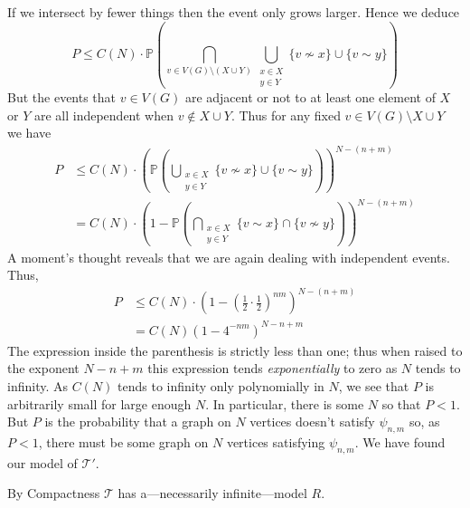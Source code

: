 \documentclass{article}
\begin{document}
\begin{enumerate}[leftmargin=*]
		If we intersect by fewer things then the event only grows larger. Hence we deduce
		\[
		P \leq C(N)\cdot\mathbb{P}\left(\bigcap_{v\in V(G)\setminus(X\cup Y)} \bigcup_{\substack{x\in X \\ y\in Y}} \{v\nsim x\}\cup \{v\sim y\}\right)
		\]
		But the events that $v\in V(G)$ are adjacent or not to at least one element of $X$ or $Y$ are all independent when $v\notin X\cup Y$. Thus for any fixed $v\in V(G)\setminus X\cup Y$ we have
		\begin{align*}
			P &\leq C(N)\cdot \left(\mathbb{P}\left(\bigcup_{\substack{x\in X \\ y\in Y}} \{v\nsim x\}\cup \{v\sim y\}\right)\right)^{N - (n+m)}\\
			&= C(N)\cdot \left(1 - \mathbb{P}\left(\bigcap_{\substack{x\in X \\ y\in Y}} \{v\sim x\}\cap \{v\nsim y\}\right)\right)^{N - (n+m)}
		\end{align*}
		A moment's thought reveals that we are again dealing with independent events. Thus,
		\begin{align*}
			P &\leq C(N)\cdot \left(1 - \left(\frac{1}{2}\cdot\frac{1}{2}\right)^{nm}\right)^{N - (n+m)}\\
			&= C(N)\left(1 - 4^{-nm}\right)^{N-n+m}
		\end{align*}
		The expression inside the parenthesis is strictly less than one; thus when raised to the exponent $N - n + m$ this expression tends \emph{exponentially} to zero as $N$ tends to infinity. As $C(N)$ tends to infinity only polynomially in $N$, we see that $P$ is arbitrarily small for large enough $N$. In particular, there is some $N$ so that $P < 1$. But $P$ is the probability that a graph on $N$ vertices doesn't satisfy $\psi_{n,m}$ so, as $P<1$, there must be some graph on $N$ vertices satisfying $\psi_{n,m}$. We have found our model of $\mathcal{T}'$.
		
		By Compactness $\mathcal{T}$ has a---necessarily infinite---model $R$.
		
	\end{enumerate}
\end{document}
